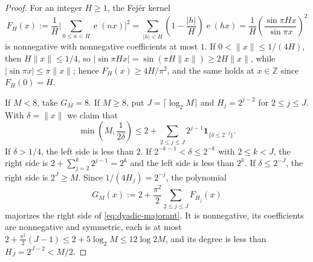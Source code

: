 \documentclass[10pt,a4paper]{amsart}
\newcommand{\Z}{\mathbb{Z}}
\newcommand{\e}{\operatorname{e}}
\begin{document}
\begin{proof}
For an integer $H\ge1$, the Fej\'er kernel
\[
  F_H(x):=\frac1H\bigg|\sum_{0\le n<H}\e(nx)\bigg|^2
  =\sum_{|h|<H}\left(1-\frac{|h|}H\right)\e(hx)
  =\frac1H\left(\frac{\sin\pi Hx}{\sin\pi x}\right)^2
\]
is nonnegative with nonnegative coefficients at most $1$.  If
$0<\|x\|\le1/(4H)$, then $H\|x\|\le1/4$, so
$|\sin\pi Hx|=\sin(\pi H\|x\|)\ge2H\|x\|$, while $|\sin\pi x|\le\pi\|x\|$;
hence $F_H(x)\ge4H/\pi^2$, and the same holds at $x\in\Z$ since
$F_H(0)=H$.

If $M<8$, take $G_M=8$.  If $M\ge8$, put $J=\lceil\log_2M\rceil$ and
$H_j=2^{j-2}$ for $2\le j\le J$.  With $\delta=\|x\|$ we claim that
\begin{equation}\label{eq:dyadic-majorant}
  \min\left(M,\frac1{2\delta}\right)
  \le2+\sum_{2\le j\le J}2^{j-1}\mathbf1_{\{\delta\le2^{-j}\}}.
\end{equation}
If $\delta>1/4$, the left side is less than $2$.  If
$2^{-k-1}<\delta\le2^{-k}$ with $2\le k<J$, the right side is
$2+\sum_{j=2}^k2^{j-1}=2^k$ and the left side is less than $2^k$.  If
$\delta\le2^{-J}$, the right side is $2^J\ge M$.  Since
$1/(4H_j)=2^{-j}$, the polynomial
\[
  G_M(x):=2+\frac{\pi^2}2\sum_{2\le j\le J}F_{H_j}(x)
\]
majorizes the right side of \eqref{eq:dyadic-majorant}.  It is
nonnegative, its coefficients are nonnegative and symmetric, each is at most
$2+\frac{\pi^2}2(J-1)\le2+5\log_2M\le12\log2M$, and its degree is less
than $H_J=2^{J-2}<M/2$.
\end{proof}
\end{document}
